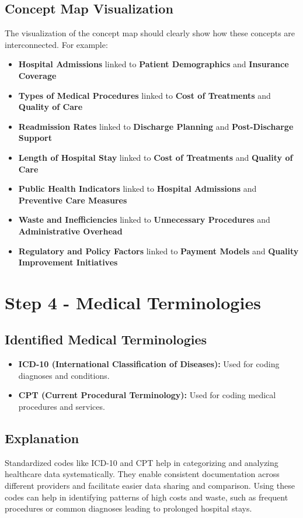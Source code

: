 \documentclass{article}
\begin{document}
\subsection*{Concept Map Visualization}
The visualization of the concept map should clearly show how these concepts are interconnected. For example:

\begin{itemize}
    \item \textbf{Hospital Admissions} linked to \textbf{Patient Demographics} and \textbf{Insurance Coverage}
    \item \textbf{Types of Medical Procedures} linked to \textbf{Cost of Treatments} and \textbf{Quality of Care}
    \item \textbf{Readmission Rates} linked to \textbf{Discharge Planning} and \textbf{Post-Discharge Support}
    \item \textbf{Length of Hospital Stay} linked to \textbf{Cost of Treatments} and \textbf{Quality of Care}
    \item \textbf{Public Health Indicators} linked to \textbf{Hospital Admissions} and \textbf{Preventive Care Measures}
    \item \textbf{Waste and Inefficiencies} linked to \textbf{Unnecessary Procedures} and \textbf{Administrative Overhead}
    \item \textbf{Regulatory and Policy Factors} linked to \textbf{Payment Models} and \textbf{Quality Improvement Initiatives}
\end{itemize}

\section*{Step 4 - Medical Terminologies}
\subsection*{Identified Medical Terminologies}
\begin{itemize}
    \item \textbf{ICD-10 (International Classification of Diseases):} Used for coding diagnoses and conditions.
    \item \textbf{CPT (Current Procedural Terminology):} Used for coding medical procedures and services.
\end{itemize}

\subsection*{Explanation}
Standardized codes like ICD-10 and CPT help in categorizing and analyzing healthcare data systematically. They enable consistent documentation across different providers and facilitate easier data sharing and comparison. Using these codes can help in identifying patterns of high costs and waste, such as frequent procedures or common diagnoses leading to prolonged hospital stays.
\end{document}
